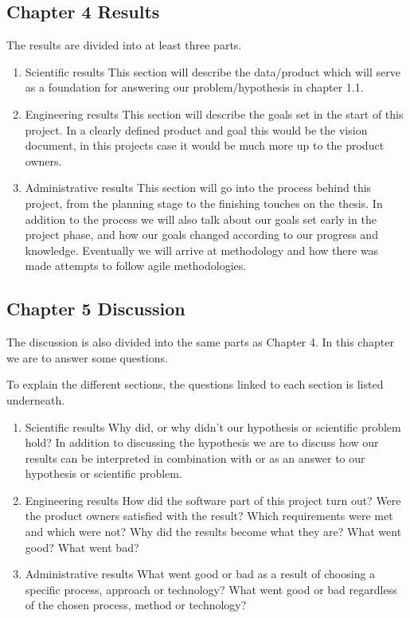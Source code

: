 \subsection{Chapter 4 Results}
The results are divided into at least three parts.
\begin{enumerate}
    \item Scientific results
    This section will describe the data/product which will serve as a foundation for answering our problem/hypothesis in chapter 1.1.
    
    \item Engineering results
    This section will describe the goals set in the start of this project. In a clearly defined product and goal this would be the vision document, in this projects case it would be much more up to the product owners. %
    
    \item Administrative results
    This section will go into the process behind this project, from the planning stage to the finishing touches on the thesis. In addition to the process we will also talk about our goals set early in the project phase, and how our goals changed according to our progress and knowledge. Eventually we will arrive at methodology and how there was made attempts to follow agile methodologies.
    
\end{enumerate}

\subsection{Chapter 5 Discussion}
The discussion is also divided into the same parts as Chapter 4. %
In this chapter we are to answer some questions.

To explain the different sections, the questions linked to each section is listed underneath.
\begin{enumerate}
    \item Scientific results
    Why did, or why didn't our hypothesis or scientific problem hold?
    In addition to discussing the hypothesis we are to discuss how our results can be interpreted in combination with or as an answer to our hypothesis or scientific problem.
    
    \item Engineering results
    How did the software part of this project turn out? Were the product owners satisfied with the result? Which requirements were met and which were not? Why did the results become what they are? What went good? What went bad?
    
    \item Administrative results
    What went good or bad as a result of choosing a specific process, approach or technology? What went good or bad regardless of the chosen process, method or technology?
    
\end{enumerate}

